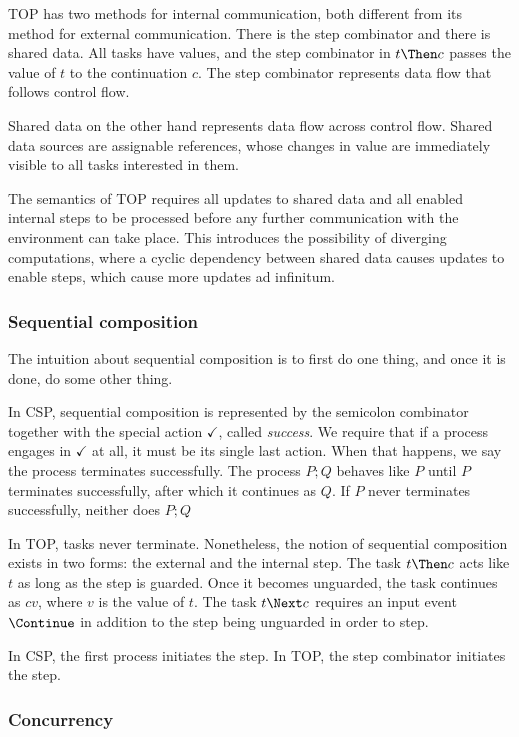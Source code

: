 TOP has two methods for internal communication, both different from its method for external communication.
There is the step combinator and there is shared data.
All tasks have values, and the step combinator in $t \Then c$ passes the value of $t$ to the continuation $c$.
The step combinator represents data flow that follows control flow.

Shared data on the other hand represents data flow across control flow.
Shared data sources are assignable references, whose changes in value are immediately visible to all tasks interested in them.

The semantics of TOP requires all updates to shared data and all enabled internal steps to be processed before any further communication with the environment can take place.
This introduces the possibility of diverging computations, where a cyclic dependency between shared data causes updates to enable steps, which cause more updates ad infinitum.


\subsubsection*{Sequential composition}

The intuition about sequential composition is to first do one thing, and once it is done, do some other thing.

In CSP, sequential composition is represented by the semicolon combinator together with the special action $\checkmark$, called \emph{success}.
We require that if a process engages in $\checkmark$ at all, it must be its single last action.
When that happens, we say the process terminates successfully.
The process $P;Q$ behaves like $P$ until $P$ terminates successfully, after which it continues as $Q$.
If $P$ never terminates successfully, neither does $P;Q$

In TOP, tasks never terminate.
Nonetheless, the notion of sequential composition exists in two forms: the external and the internal step.
The task $t \Then c$ acts like $t$ as long as the step is guarded.
Once it becomes unguarded, the task continues as $cv$, where $v$ is the value of $t$.
The task $t \Next c$ requires an input event $\Continue$ in addition to the step being unguarded in order to step.

In CSP, the first process initiates the step.
In TOP, the step combinator initiates the step.


\subsubsection*{Concurrency}

